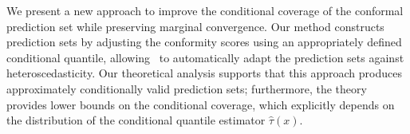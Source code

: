 
\vspace{-10pt}
We present a new approach to improve the conditional coverage of the conformal prediction set while preserving marginal convergence.
Our method constructs prediction sets by adjusting the conformity scores using an appropriately defined conditional quantile, allowing \RCP\ to automatically adapt the prediction sets against heteroscedasticity.
Our theoretical analysis supports that this approach produces approximately conditionally valid prediction sets; furthermore, the theory provides lower bounds on the conditional coverage, which explicitly depends on the distribution of the conditional quantile estimator $\widehat{\tau}(x)$.
